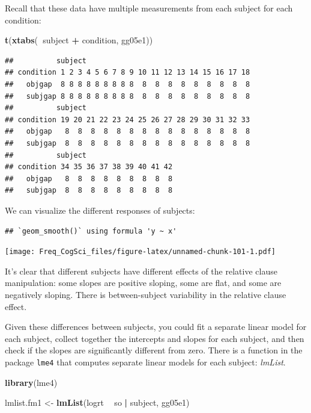\documentclass[12pt,]{krantz}
\newenvironment{Shaded}{\begin{snugshade}}{\end{snugshade}}
\newcommand{\KeywordTok}[1]{\textcolor[rgb]{0.13,0.29,0.53}{\textbf{#1}}}
\newcommand{\NormalTok}[1]{#1}
\newcommand{\OperatorTok}[1]{\textcolor[rgb]{0.81,0.36,0.00}{\textbf{#1}}}
\newcommand{\StringTok}[1]{\textcolor[rgb]{0.31,0.60,0.02}{#1}}
\begin{document}
Recall that these data have multiple measurements from each subject for each condition:

\begin{Shaded}
\begin{Highlighting}[]
\KeywordTok{t}\NormalTok{(}\KeywordTok{xtabs}\NormalTok{(}\OperatorTok{~}\NormalTok{subject }\OperatorTok{+}\StringTok{ }\NormalTok{condition, gg05e1))}
\end{Highlighting}
\end{Shaded}

\begin{verbatim}
##          subject
## condition 1 2 3 4 5 6 7 8 9 10 11 12 13 14 15 16 17 18
##   objgap  8 8 8 8 8 8 8 8 8  8  8  8  8  8  8  8  8  8
##   subjgap 8 8 8 8 8 8 8 8 8  8  8  8  8  8  8  8  8  8
##          subject
## condition 19 20 21 22 23 24 25 26 27 28 29 30 31 32 33
##   objgap   8  8  8  8  8  8  8  8  8  8  8  8  8  8  8
##   subjgap  8  8  8  8  8  8  8  8  8  8  8  8  8  8  8
##          subject
## condition 34 35 36 37 38 39 40 41 42
##   objgap   8  8  8  8  8  8  8  8  8
##   subjgap  8  8  8  8  8  8  8  8  8
\end{verbatim}

We can visualize the different responses of subjects:

\begin{verbatim}
## `geom_smooth()` using formula 'y ~ x'
\end{verbatim}

\texttt{[image: Freq\_CogSci\_files/figure-latex/unnamed-chunk-101-1.pdf]}

It's clear that different subjects have different effects of the relative clause manipulation: some slopes are positive sloping, some are flat, and some are negatively sloping. There is between-subject variability in the relative clause effect.

Given these differences between subjects, you could fit a separate linear model for each subject, collect together the intercepts and slopes for each subject, and then check if the slopes are significantly different from zero. There is a function in the package \texttt{lme4} that computes separate linear models for each subject: \emph{lmList}.

\begin{Shaded}
\begin{Highlighting}[]
\KeywordTok{library}\NormalTok{(lme4)}

\NormalTok{lmlist.fm1 <-}\StringTok{ }\KeywordTok{lmList}\NormalTok{(logrt }\OperatorTok{~}\StringTok{ }\NormalTok{so }\OperatorTok{|}\StringTok{ }\NormalTok{subject, gg05e1)}
\end{Highlighting}
\end{Shaded}
\end{document}
